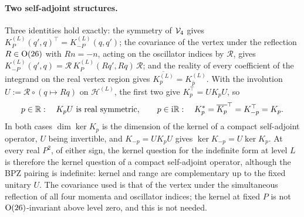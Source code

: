 \paragraph{Two self-adjoint structures.}
Three identities hold exactly: the symmetry of $\mathcal{V}_{4}$ gives $K^{(L)}_P(q', q)^\top = K^{(L)}_{-P}(q, q')$; the covariance of the vertex under the reflection $R \in \mathrm{O}(26)$ with $R n = - n$, acting on the oscillator indices by $\mathcal R$, gives $K^{(L)}_{-P}(q', q) = \mathcal R \, K^{(L)}_P(R q', R q) \, \mathcal R$; and the reality of every coefficient of the integrand on the real vertex region gives $\overline{K^{(L)}_p} = K^{(L)}_{\bar p}$.
With the involution $U := \mathcal R \circ (q \mapsto R q)$ on $\mathcal H^{(L)}$, the first two give $K_p^\top = U K_p U$, so
\begin{equation}
  \label{eq:mom:self-adjoint}
  p \in \mathbb{R}:\quad
  K_p U \ \text{is real symmetric},
  \qquad
  p \in \mathrm{i} \mathbb{R}:\quad
  K_p^*
    = \overline{K_p}^\top
    = K_{-p}^\top
    = K_p.
\end{equation}
In both cases $\dim \ker K_p$ is the dimension of the kernel of a compact self-adjoint operator, $U$ being invertible, and $K_{-p} = U K_p U$ gives $\ker K_{-p} = U \ker K_p$.
At every real $P^2$, of either sign, the kernel question for the indefinite form at level $L$ is therefore the kernel question of a compact self-adjoint operator, although the BPZ pairing is indefinite: kernel and range are complementary up to the fixed unitary $U$.
The covariance used is that of the vertex under the simultaneous reflection of all four momenta and oscillator indices; the kernel at fixed $P$ is not $\mathrm{O}(26)$-invariant above level zero, and this is not needed.

